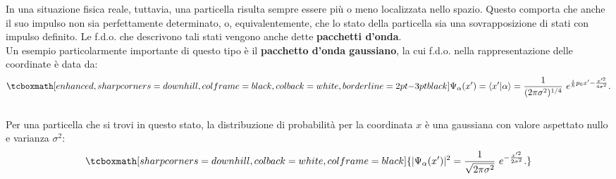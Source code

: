 In una situazione fisica reale, tuttavia, una particella risulta sempre essere più o meno localizzata nello spazio. Questo comporta che anche il suo impulso non sia perfettamente determinato, o, equivalentemente, che lo stato della particella sia una sovrapposizione di stati con impulso definito. Le f.d.o. che descrivono tali stati vengono anche dette \textbf{pacchetti d'onda}.\\

Un esempio particolarmente importante di questo tipo è il \textbf{pacchetto d'onda gaussiano}, la cui f.d.o. nella rappresentazione delle coordinate è data da:
	\begin{equation}
		\tcboxmath[enhanced, sharp corners=downhill, colframe=black, colback=white, borderline={2pt}{-3pt}{black}]{
			\Psi_\alpha (x') = \langle x' | \alpha \rangle = \frac{1}{(2 \pi \sigma^2)^{1/4}}~  e^{\frac{i}{\hbar}p_0 x' - \frac{x'^2}{4 \sigma^2}}.
			}
	\end{equation}\\
	
Per una particella che si trovi in questo stato, la distribuzione di probabilità per la coordinata $x$ è una gaussiana con valore aspettato nullo e varianza $\sigma^2$:
	\begin{equation}
		\tcboxmath[sharp corners=downhill, colback=white, colframe=black]{
			|\Psi_\alpha (x')|^2 = \frac{1}{\sqrt{2 \pi \sigma^2}}~   e^{- \frac{x'^2}{2 \sigma^2}}.
			}
	\end{equation}\\
	
